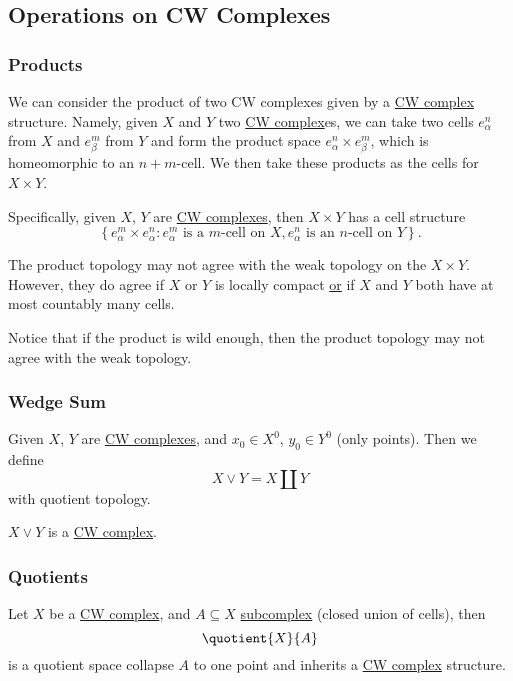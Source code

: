 \subsection{Operations on CW Complexes}
\subsubsection{Products}\label{sssec:Products}
We can consider the product of two CW complexes given by a \hyperref[def:CW-Complex]{CW complex} structure. Namely, given \(X\) and \(Y\)
two \hyperref[def:CW-Complex]{CW complex}es, we can take two cells \(e^n_{\alpha }\) from \(X\) and \(e^m_{\beta }\) from \(Y\) and
form the product space \(e^n_{\alpha }\times e^m_{\beta }\), which is homeomorphic to an \(n+m\)-cell. We then
take these products as the cells for \(X\times Y\).

Specifically, given \(X\), \(Y\) are \hyperref[def:CW-Complex]{CW complexes}, then \(X\times Y\) has a cell structure
\[
	\left\{e_{\alpha}^m \times e_{\alpha}^n\colon e^m_{\alpha}\text{ is a \(m\)-cell on \(X\)}, e^n_{\alpha}\text{ is an \(n\)-cell on \(Y\)}\right\}.
\]
\begin{remark}
	The product topology may not agree with the weak topology on the \(X\times Y\). However, they do agree if
	\(X\) or \(Y\) is locally compact \underline{or} if \(X\) and \(Y\) both have at most countably many cells.
\end{remark}

\begin{note}
	Notice that if the product is wild enough, then the product topology may not agree with the weak topology.
\end{note}
\subsubsection{Wedge Sum}\label{sssec:Wedge-sum}
Given \(X\), \(Y\) are \hyperref[def:CW-Complex]{CW complexes}, and \(x_0\in X^0\), \(y_0\in Y^0\) (only points). Then we define
\[
	X\vee Y = X\coprod Y
\]
with quotient topology.
\begin{remark}
	\(X\lor Y\) is a \hyperref[def:CW-Complex]{CW complex}.
\end{remark}

\subsubsection{Quotients}\label{sssec:Quotients}
Let \(X\) be a \hyperref[def:CW-Complex]{CW complex}, and \(A\subseteq X\) \hyperref[def:CW-subcomplex]{subcomplex} (closed union of cells), then
\[
	\quotient{X}{A}
\]
is a quotient space collapse \(A\) to one point and inherits a \hyperref[def:CW-Complex]{CW complex} structure.

